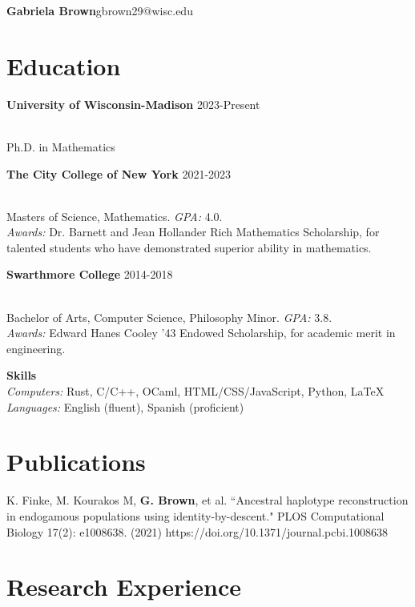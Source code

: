 \documentclass[11pt, reqno]{amsart}
\begin{document}
	\begin{flushleft}{\LARGE \textbf{Gabriela Brown}}\hfill gbrown29@wisc.edu
	\end{flushleft}
	
	\section{Education} %
	\newcommand{\school}[3]{
		\begin{raggedleft} {\large \textbf{#1}} \hfill #2\end{raggedleft} \\
		#3
	}
	\school{University of Wisconsin-Madison}{2023-Present}{Ph.D. in Mathematics}
	
	\school{The City College of New York}{2021-2023}{Masters of Science, Mathematics. \textit{GPA:} 4.0.\\ 
	\textit{Awards:} Dr. Barnett and Jean Hollander Rich Mathematics Scholarship, for talented students who have demonstrated superior ability in mathematics.}
				
	\school{Swarthmore College}{2014-2018}{Bachelor of Arts, Computer Science, Philosophy Minor. \textit{GPA:} 3.8. \\ 
	\textit{Awards:} Edward Hanes Cooley '43 Endowed Scholarship, for academic merit in engineering.
	}

	{\large \textbf{Skills}} \\
	\textit{Computers:} Rust, C/C++, OCaml, HTML/CSS/JavaScript, Python, \LaTeX \\
	\textit{Languages:} English (fluent), Spanish (proficient)


	\section{Publications} %
	K. Finke, M. Kourakos M, \textbf{G. Brown}, et al. ``Ancestral haplotype reconstruction in endogamous populations using identity-by-descent." PLOS Computational Biology 17(2): e1008638. (2021) https://doi.org/10.1371/journal.pcbi.1008638
		
	
	\section{Research Experience} %
	\newcommand{\research}[4]{
		\begin{raggedleft}
			{\large \textbf{#1}} \textit{#3} \hfill {#2}
		\end{raggedleft} \\
		#4
	}
\end{document}
